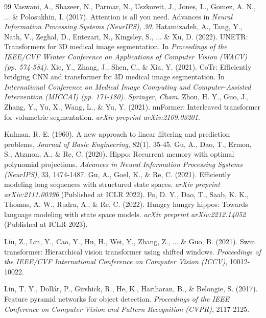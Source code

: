 \documentclass[10pt, a4paper, twocolumn]{article}
\begin{document}
\begin{thebibliography}{99}
Vaswani, A., Shazeer, N., Parmar, N., Uszkoreit, J., Jones, L., Gomez, A. N., ... \& Polosukhin, I. (2017). Attention is all you need. Advances in \textit{Neural Information Processing Systems (NeurIPS), 30}. 
Hatamizadeh, A., Tang, Y., Nath, V., Zeghal, D., Entezari, N., Kingsley, S., ... \& Xu, D. (2022). UNETR: Transformers for 3D medical image segmentation. In \textit{Proceedings of the IEEE/CVF Winter Conference on Applications of Computer Vision (WACV) (pp. 574-584)}. 
Xie, Y., Zhang, J., Shen, C., \& Xia, Y. (2021). CoTr: Efficiently bridging CNN and transformer for 3D medical image segmentation. In \textit{International Conference on Medical Image Computing and Computer-Assisted Intervention (MICCAI) (pp. 171-180). Springer, Cham}. 
Zhou, H. Y., Guo, J., Zhang, Y., Yu, X., Wang, L., \& Yu, Y. (2021). nnFormer: Interleaved transformer for volumetric segmentation. \textit{arXiv preprint arXiv:2109.03201}. 

Kalman, R. E. (1960). A new approach to linear filtering and prediction problems. \textit{Journal of Basic Engineering}, 82(1), 35-45.
Gu, A., Dao, T., Ermon, S., Atzmon, A., \& Re, C. (2020). Hippo: Recurrent memory with optimal polynomial projections. \textit{Advances in Neural Information Processing Systems (NeurIPS)}, 33, 1474-1487.
Gu, A., Goel, K., \& Re, C. (2021). Efficiently modeling long sequences with structured state spaces. \textit{arXiv preprint arXiv:2111.00396} (Published at ICLR 2022).
Fu, D. Y., Dao, T., Saab, K. K., Thomas, A. W., Rudra, A., \& Re, C. (2022). Hungry hungry hippos: Towards language modeling with state space models. \textit{arXiv preprint arXiv:2212.14052} (Published at ICLR 2023).






Liu, Z., Lin, Y., Cao, Y., Hu, H., Wei, Y., Zhang, Z., ... \& Guo, B. (2021). Swin transformer: Hierarchical vision transformer using shifted windows. \textit{Proceedings of the IEEE/CVF International Conference on Computer Vision (ICCV)}, 10012-10022.

Lin, T. Y., Dollár, P., Girshick, R., He, K., Hariharan, B., \& Belongie, S. (2017). Feature pyramid networks for object detection. \textit{Proceedings of the IEEE Conference on Computer Vision and Pattern Recognition (CVPR)}, 2117-2125.


\end{thebibliography}
\end{document}
